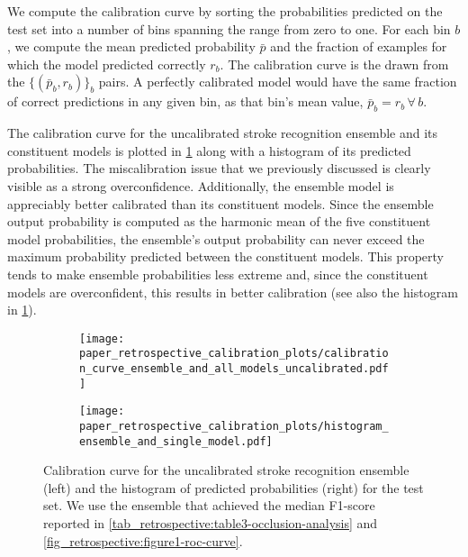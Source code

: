 We compute the calibration curve by sorting the probabilities predicted on the test set into a number of bins spanning the range from zero to one. For each bin $b$, we compute the mean predicted probability $\bar{p}$ and the fraction of examples for which the model predicted correctly $r_{b}$. The calibration curve is the drawn from the $\{(\bar{p}_{b}, r_{b})\}_b$ pairs. A perfectly calibrated model would have the same fraction of correct predictions in any given bin, as that bin's mean value, $\bar{p}_{b} = r_{b}\,\forall\,b$. 

The calibration curve for the uncalibrated stroke recognition ensemble and its constituent models is plotted in \cref{fig_discussion:retrospective-paper-calibration-curve-of-uncalibrated-model} along with a histogram of its predicted probabilities. The miscalibration issue that we previously discussed is clearly visible as a strong overconfidence. 
Additionally, the ensemble model is appreciably better calibrated than its constituent models. Since the ensemble output probability is computed as the harmonic mean of the five constituent model probabilities, the ensemble's output probability can never exceed the maximum probability predicted between the constituent models. This property tends to make ensemble probabilities less extreme and, since the constituent models are overconfident, this results in better calibration (see also the histogram in \cref{fig_discussion:retrospective-paper-calibration-curve-of-uncalibrated-model}). 

\begin{figure}
    \begin{subfigure}[c]{0.48\columnwidth}
        \centering
        \texttt{[image: paper\_retrospective\_calibration\_plots/calibration\_curve\_ensemble\_and\_all\_models\_uncalibrated.pdf]}
    \end{subfigure}
    \begin{subfigure}[c]{0.48\columnwidth}
        \centering
        \texttt{[image: paper\_retrospective\_calibration\_plots/histogram\_ensemble\_and\_single\_model.pdf]}
    \end{subfigure}
    \caption[Calibration curve for the uncalibrated stroke recognition ensemble and empirical distribution of predicted probabilities.]{%
        Calibration curve for the uncalibrated stroke recognition ensemble (left) and the histogram of predicted probabilities (right) for the test set. 
        We use the ensemble that achieved the median F1-score reported in \cref{tab_retrospective:table3-occlusion-analysis} and \cref{fig_retrospective:figure1-roc-curve}.}
    \label{fig_discussion:retrospective-paper-calibration-curve-of-uncalibrated-model}
\end{figure}


